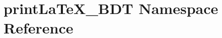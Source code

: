 \hypertarget{namespaceprintLaTeX__BDT}{
\section{printLaTeX\_\-BDT Namespace Reference}
\label{namespaceprintLaTeX__BDT}
}
